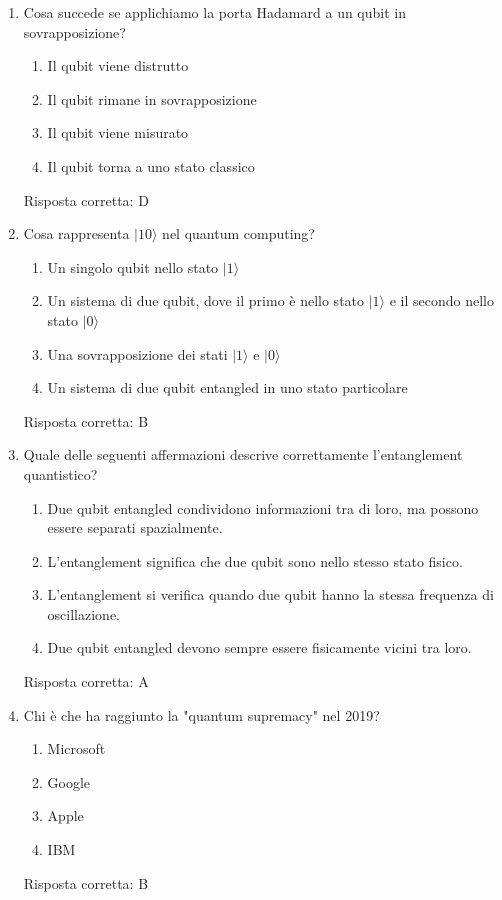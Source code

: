 \documentclass{article}
\begin{document}
\begin{enumerate}[label=\textbf{Domanda \arabic*.}]
\item Cosa succede se applichiamo la porta Hadamard a un qubit in sovrapposizione?
\begin{enumerate}[label=\Alph*.]
    
    \item Il qubit viene distrutto
    \item Il qubit rimane in sovrapposizione
    \item Il qubit viene misurato
    \item Il qubit torna a uno stato classico
\end{enumerate}
Risposta corretta: D

\item Cosa rappresenta \(|1 0\rangle\) nel quantum computing?
\begin{enumerate}[label=\Alph*.]
    \item Un singolo qubit nello stato \(|1\rangle\)
    \item Un sistema di due qubit, dove il primo è nello stato \(|1\rangle\) e il secondo nello stato \(|0\rangle\)
    \item Una sovrapposizione dei stati \(|1\rangle\) e \(|0\rangle\)
    \item Un sistema di due qubit entangled in uno stato particolare
\end{enumerate}
Risposta corretta: B

\item Quale delle seguenti affermazioni descrive correttamente l'entanglement quantistico?
\begin{enumerate}[label=\Alph*.]
    \item Due qubit entangled condividono informazioni tra di loro, ma possono essere separati spazialmente.
    \item L'entanglement significa che due qubit sono nello stesso stato fisico.
    \item L'entanglement si verifica quando due qubit hanno la stessa frequenza di oscillazione.
    \item Due qubit entangled devono sempre essere fisicamente vicini tra loro.
\end{enumerate}
Risposta corretta: A


\item Chi è che ha raggiunto la "quantum supremacy" nel 2019?
\begin{enumerate}[label=\Alph*.]
    \item Microsoft
    \item Google
    \item Apple
    \item IBM
\end{enumerate}
Risposta corretta: B

\end{enumerate}
\end{document}

